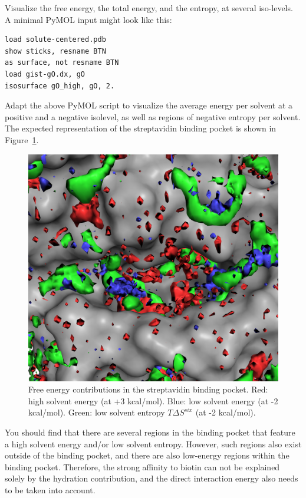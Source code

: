 \documentclass[9pt,tutorial]{livecoms}
\begin{document}
Visualize the free energy, the total energy, and the entropy, at several iso-levels.
A minimal PyMOL input might look like this:

\begin{lstlisting}
load solute-centered.pdb
show sticks, resname BTN
as surface, not resname BTN
load gist-gO.dx, gO
isosurface gO_high, gO, 2.
\end{lstlisting}

Adapt the above PyMOL script to visualize the average energy per solvent at a positive and a negative isolevel, as well as regions of negative entropy per solvent.
The expected representation of the streptavidin binding pocket is shown in Figure~\ref{fig_binding_pocket_pymol}.

\begin{figure}
	\centering
	\includegraphics[width=0.8\linewidth]{figures/binding_pocket_S_-2_E_-2_E_3.png}
	\caption{Free energy contributions in the streptavidin binding pocket. Red: high solvent energy (at +3 kcal/mol). Blue: low solvent energy (at -2 kcal/mol). Green: low solvent entropy $T\Delta S^{six}$ (at -2 kcal/mol).}\label{fig_binding_pocket_pymol}
\end{figure}

You should find that there are several regions in the binding pocket that feature a high solvent energy and/or low solvent entropy.
However, such regions also exist outside of the binding pocket, and there are also low-energy regions within the binding pocket.
Therefore, the strong affinity to biotin can not be explained solely by the hydration contribution, and the direct interaction energy also needs to be taken into account.
\end{document}
